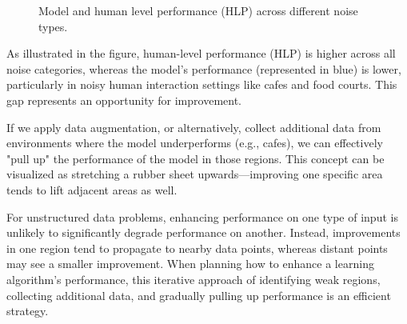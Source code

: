 \documentclass[12pt,openany]{book}
\begin{document}
\begin{figure}[H]
    \centering

\caption{Model and human level performance (HLP) across different noise types.}
\label{fig:performance_rubber_band}
\end{figure}

As illustrated in the figure, human-level performance (HLP) is higher across all noise categories, whereas the model's performance (represented in blue) is lower, particularly in noisy human interaction settings like cafes and food courts. This gap represents an opportunity for improvement. 
\newline

If we apply data augmentation, or alternatively, collect additional data from environments where the model underperforms (e.g., cafes), we can effectively "pull up" the performance of the model in those regions. This concept can be visualized as stretching a rubber sheet upwards—improving one specific area tends to lift adjacent areas as well. 
\newline

For unstructured data problems, enhancing performance on one type of input is unlikely to significantly degrade performance on another. Instead, improvements in one region tend to propagate to nearby data points, whereas distant points may see a smaller improvement. When planning how to enhance a learning algorithm’s performance, this iterative approach of identifying weak regions, collecting additional data, and gradually pulling up performance is an efficient strategy. 
\newline
\end{document}

